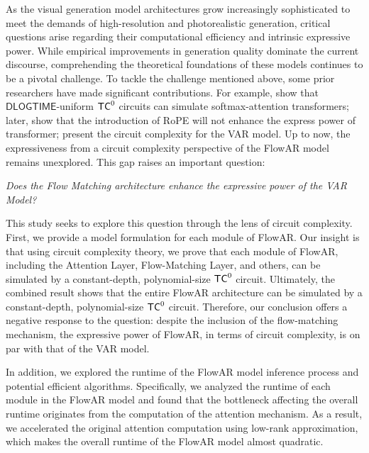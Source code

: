 As the visual generation model architectures grow increasingly sophisticated to meet the demands of high-resolution and photorealistic generation, critical questions arise regarding their computational efficiency and intrinsic expressive power. While empirical improvements in generation quality dominate the current discourse, comprehending the theoretical foundations of these models continues to be a pivotal challenge. To tackle the challenge mentioned above, some prior researchers have made significant contributions. For example, \cite{ms24} show that $\mathsf{DLOGTIME}$-uniform $\mathsf{TC}^0$ circuits can simulate softmax-attention transformers; later, \cite{cll+24} show that the introduction of RoPE will not enhance the express power of transformer; \cite{kll+25_circuit_var} present the circuit complexity for the VAR model. Up to now, the expressiveness from a circuit complexity perspective of the FlowAR model remains unexplored. This gap raises an important question:
\begin{center}
   {\it Does the Flow Matching architecture enhance the expressive power of the VAR Model?} 
\end{center}
This study seeks to explore this question through the lens of circuit complexity. First, we provide a model formulation for each module of FlowAR. Our insight is that using circuit complexity theory, we prove that each module of FlowAR, including the Attention Layer, Flow-Matching Layer, and others, can be simulated by a constant-depth, polynomial-size $\mathsf{TC}^0$ circuit. Ultimately, the combined result shows that the entire FlowAR architecture can be simulated by a constant-depth, polynomial-size $\mathsf{TC}^0$ circuit. Therefore, our conclusion offers a negative response to the question: despite the inclusion of the flow-matching mechanism, the expressive power of FlowAR, in terms of circuit complexity, is on par with that of the VAR model.

In addition, we explored the runtime of the FlowAR model inference process and potential efficient algorithms. Specifically, we analyzed the runtime of each module in the FlowAR model and found that the bottleneck affecting the overall runtime originates from the computation of the attention mechanism. As a result, we accelerated the original attention computation using low-rank approximation, which makes the overall runtime of the FlowAR model almost quadratic.



